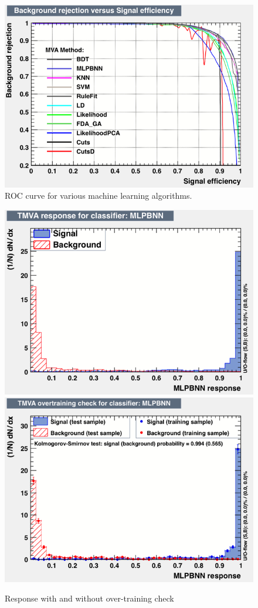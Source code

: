 \begin{figure}[h!]
\centering

\includegraphics[width=\textwidth]{figures/neutrinoTMVA/rejBvsS.png}
\caption{ROC curve for various machine learning algorithms.}
\label{fig:TMVANeuroc}
\end{figure}

\begin{figure}[h!]
\centering
\includegraphics[width=.49\textwidth]{figures/neutrinoTMVA/mva_MLPBNN.png}
\includegraphics[width=.49\textwidth]{figures/neutrinoTMVA/overtrain_MLPBNN.png}
\caption{Response with and without over-training check}
\label{fig:TMVANeuresponce}
\end{figure}

